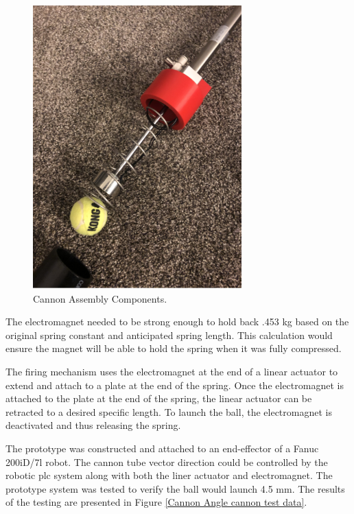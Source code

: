 \documentclass[11pt]{article}
\begin{document}
\begin{figure}[H]
    \centering
        \includegraphics[scale=.80, angle =0]{figures/Launcher.PNG}
    \caption{Cannon Assembly Components.}
    \label{LA}
\end{figure}

The electromagnet needed to be strong enough to hold back .453 kg based on the original spring constant and anticipated spring length. This calculation would ensure the magnet will be able to hold the spring when it was fully compressed.   


The firing mechanism uses the electromagnet at the end of a linear actuator to extend and attach to a plate at the end of the spring. Once the electromagnet is attached to the plate at the end of the spring, the linear actuator can be retracted to a desired specific length. To launch the ball, the electromagnet is deactivated and thus releasing the spring.



The prototype was constructed and attached to an end-effector of a Fanuc 200iD/7l robot. The cannon tube vector direction could be controlled by the robotic plc system along with both the liner actuator and electromagnet. The prototype system was tested to verify the ball would launch 4.5 mm. The results of the testing are presented in Figure \ref{Cannon Angle cannon test data}.
\end{document}
